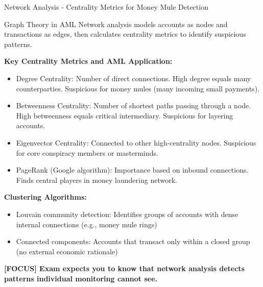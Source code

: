 \documentclass[11pt,a4paper]{beamer}
\newcommand{\examfocus}[1]{\textcolor{orange!80!black}{\textbf{[FOCUS] #1}}}
\begin{document}
	\begin{frame}{Network Analysis - Centrality Metrics for Money Mule Detection}
		\begin{block}{Graph Theory in AML}
			Network analysis models accounts as nodes and transactions as edges, then calculates centrality metrics to identify suspicious patterns.
		\end{block}
		
		\textbf{Key Centrality Metrics and AML Application:}
		\begin{itemize}
			\item Degree Centrality: Number of direct connections. High degree equals many counterparties. Suspicious for money mules (many incoming small payments).
			\item Betweenness Centrality: Number of shortest paths passing through a node. High betweenness equals critical intermediary. Suspicious for layering accounts.
			\item Eigenvector Centrality: Connected to other high-centrality nodes. Suspicious for core conspiracy members or masterminds.
			\item PageRank (Google algorithm): Importance based on inbound connections. Finds central players in money laundering network.
		\end{itemize}
		
		\textbf{Clustering Algorithms:}
		\begin{itemize}
			\item Louvain community detection: Identifies groups of accounts with dense internal connections (e.g., money mule rings)
			\item Connected components: Accounts that transact only within a closed group (no external economic rationale)
		\end{itemize}
		
		\examfocus{Exam expects you to know that network analysis detects patterns individual monitoring cannot see.}
	\end{frame}
	
\end{document}
